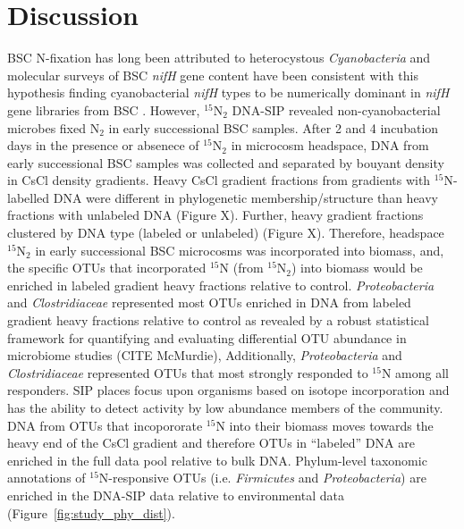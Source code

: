 \section{Discussion}
BSC N-fixation has long been attributed to heterocystous
\textit{Cyanobacteria} and molecular surveys of BSC \textit{nifH} gene content
have been consistent with this hypothesis finding cyanobacterial \textit{nifH}
types to be numerically dominant in \textit{nifH} gene libraries from BSC
\citep{Yeager,14766579,Yeager_2012}. However, $^{15}$N$_{2}$ DNA-SIP revealed
non-cyanobacterial microbes fixed N$_{2}$ in early successional BSC samples.
After 2 and 4 incubation days in the presence or absenece of $^{15}$N$_{2}$
in microcosm headspace, DNA from early successional BSC samples was collected
and separated by bouyant density in CsCl density gradients.
Heavy CsCl gradient fractions from gradients with $^{15}$N-labelled DNA were
different in phylogenetic membership/structure than heavy fractions with
unlabeled DNA (Figure X).  Further, heavy gradient fractions clustered by DNA
type (labeled or unlabeled) (Figure X). Therefore, headspace $^{15}$N$_{2}$ in
early successional BSC microcosms was incorporated into biomass, and, the
specific OTUs that incorporated $^{15}$N (from $^{15}$N$_{2}$) into biomass
would be enriched in labeled gradient heavy fractions relative to control.
\textit{Proteobacteria} and \textit{Clostridiaceae} represented most OTUs
enriched in DNA from labeled gradient heavy fractions relative to control as
revealed by a robust statistical framework for quantifying and evaluating
differential OTU abundance in microbiome studies (CITE McMurdie), Additionally,
\textit{Proteobacteria} and \textit{Clostridiaceae} represented OTUs that most
strongly responded to $^{15}$N among all responders. SIP places focus upon
organisms based on isotope incorporation and has the ability to detect activity
by low abundance members of the community.  DNA from OTUs that incopororate
$^{15}$N into their biomass moves towards the heavy end of the CsCl gradient
and therefore OTUs in ``labeled'' DNA are enriched in the full data pool
relative to bulk DNA.  Phylum-level taxonomic annotations of
$^{15}$N-responsive OTUs (i.e.  \textit{Firmicutes} and
\textit{Proteobacteria}) are enriched in the DNA-SIP data relative to
environmental data (Figure~\ref{fig:study_phy_dist}).

